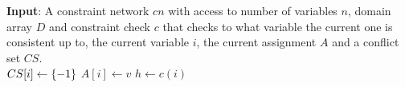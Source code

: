 \State \textbf{Input}: A constraint network $cn$ with access to number of variables $n$, domain array $D$ and constraint check $c$ that checks to what variable the current one is consistent up to, the current variable $i$, the current assignment $A$ and a conflict set $CS$.\\
    \State $CS[i] \gets \left\{-1\right\}$
        \State $A[i]\gets v$
        \State $h \gets c(i)$
        \Else
                \State {}
            \EndIf
                \State {}
            \EndIf
                \State {}
            \EndIf
        \EndIf
    \EndFor
    \State{}
\EndFunction